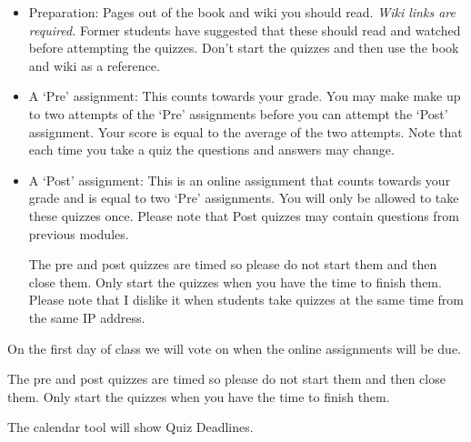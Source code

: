 \documentclass[letterpaper,10pt]{article}
\begin{document}
\begin{itemize}
\item Preparation: Pages out of the book and wiki you should read.
  \emph{Wiki links are required.}  Former students have suggested that these should read and watched before attempting the quizzes.  Don't start the quizzes and then use the book and wiki as a reference.
  
\item A `Pre' assignment: This counts towards your grade.
  You may make make up to two attempts of the `Pre' assignments before you can attempt the `Post' assignment.  
  Your score is equal
  to the average of the two attempts. Note that each time you take a quiz the questions and answers may change.

\item A `Post' assignment: This is an online assignment that counts
  towards your grade and is equal to two `Pre' assignments.  You will
  only be allowed to take these quizzes once.  Please note that Post quizzes may contain questions from previous modules.

  The pre and post quizzes are timed so please do not start them and
  then close them.  Only start the quizzes when you have the time to
  finish them.  Please note that I dislike it when students take
  quizzes at the same time from the same IP address.

\end{itemize}


On the first day of class we will vote on when the online assignments will be due.  

The pre and post quizzes are timed so please do not start them and
then close them.  Only start the quizzes when you have the time to
finish them.   


The calendar tool will show Quiz Deadlines. 
  
\end{document}
